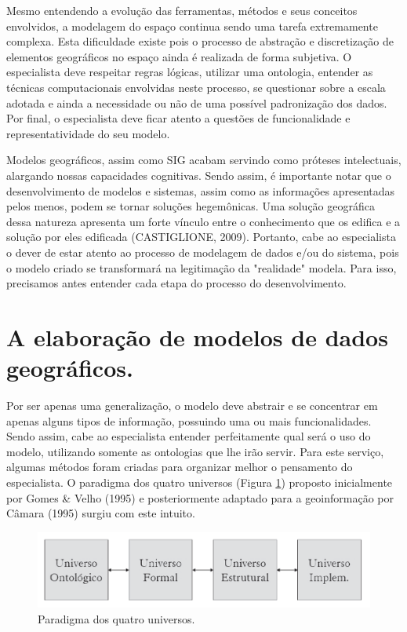 Mesmo entendendo a evolução das ferramentas, métodos e seus conceitos envolvidos, a modelagem do espaço continua sendo uma tarefa extremamente complexa. Esta dificuldade existe pois o processo de abstração e discretização de elementos geográficos no espaço ainda é realizada de forma subjetiva. O especialista deve respeitar regras lógicas, utilizar uma ontologia, entender as técnicas computacionais envolvidas neste processo, se questionar sobre a escala adotada e ainda a necessidade ou não de uma possível padronização dos dados. Por final, o especialista deve ficar atento a questões de funcionalidade e representatividade do seu modelo.

Modelos geográficos, assim como SIG acabam servindo como próteses intelectuais, alargando nossas capacidades cognitivas. Sendo assim, é importante notar que o desenvolvimento de modelos e sistemas, assim como as informações apresentadas pelos menos, podem se tornar soluções hegemônicas. Uma solução geográfica dessa natureza apresenta um forte vínculo entre o conhecimento que os edifica e a solução por eles edificada (CASTIGLIONE, 2009)\cite{CASTIGLIONE}. Portanto, cabe ao especialista o dever de estar atento ao processo de modelagem de dados e/ou do sistema, pois o modelo criado se transformará na legitimação da "realidade" modela. Para isso, precisamos antes entender cada etapa do processo do desenvolvimento.

\section{A elaboração de modelos de dados geográficos.}

Por ser apenas uma generalização, o modelo deve abstrair e se concentrar em apenas alguns tipos de informação, possuindo uma ou mais funcionalidades. Sendo assim, cabe ao especialista entender perfeitamente qual será o uso do modelo, utilizando somente as ontologias que lhe irão servir.
Para este serviço, algumas métodos foram criadas para organizar melhor o pensamento do especialista. O paradigma dos quatro universos (Figura \ref{fig:paradigmaquatrouniversos}) proposto inicialmente por Gomes \& Velho (1995)\cite{GOMES_VELHO} e posteriormente adaptado para a geoinformação por Câmara (1995)\cite{CAMARA} surgiu com este intuito.

	\begin{figure} [h]
		\centering
		\includegraphics[width=1\linewidth]{data/paradigma_quatro_universos}
		\caption{Paradigma dos quatro universos.\cite{CAMARA_b}}
		\label{fig:paradigmaquatrouniversos}
	\end{figure} 

